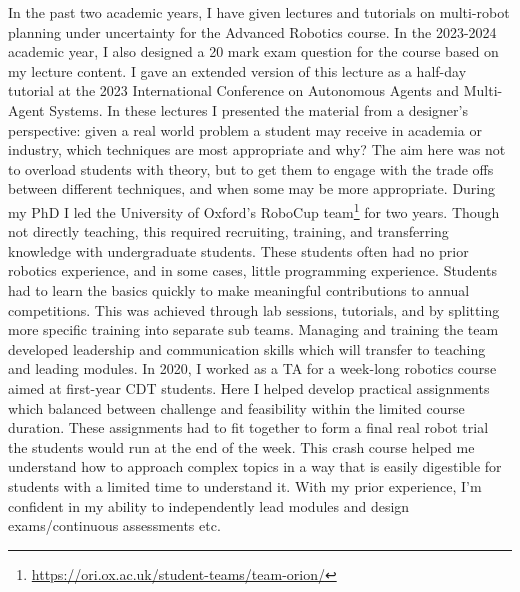 \documentclass[12pt]{article}
\begin{document}
In the past two academic years, I have given lectures and tutorials on multi-robot planning under uncertainty for the Advanced Robotics course.
%
In the 2023-2024 academic year, I also designed a 20 mark exam question for the course based on my lecture content.
%
I gave an extended version of this lecture as a half-day tutorial at the 2023 International Conference on Autonomous Agents and Multi-Agent Systems.
%
In these lectures I presented the material from a designer's perspective: given a real world problem a student may receive in academia or industry, which techniques are most appropriate and why?
%
The aim here was not to overload students with theory, but to get them to engage with the trade offs between different techniques, and when some may be more appropriate.
%
During my PhD I led the University of Oxford's RoboCup team\footnote{\url{https://ori.ox.ac.uk/student-teams/team-orion/}} for two years.
%
Though not directly teaching, this required recruiting, training, and transferring knowledge with undergraduate students.
%
These students often had no prior robotics experience, and in some cases, little programming experience.
%
Students had to learn the basics quickly to make meaningful contributions to annual competitions.
%
This was achieved through lab sessions, tutorials, and by splitting more specific training into separate sub teams.
%
Managing and training the team developed leadership and communication skills which will transfer to teaching and leading modules.
%
In 2020, I worked as a TA for a week-long robotics course aimed at first-year CDT students.
%
Here I helped develop practical assignments which balanced between challenge and feasibility within the limited course duration.
%
These assignments had to fit together to form a final real robot trial the students would run at the end of the week.
%
This crash course helped me understand how to approach complex topics in a way that is easily digestible for students with a limited time to understand it.
%
With my prior experience, I'm confident in my ability to independently lead modules and design exams/continuous assessments etc.
\end{document}
